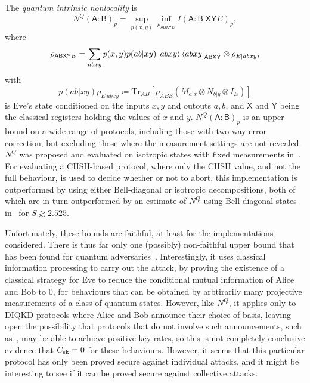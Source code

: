 \documentclass[10pt, a4paper]{article}
\numberwithin{equation}{section} %
\theoremstyle{definition}
\theoremstyle{plain}
\newcommand{\?}{\mathrel{?}} %
\newcommand{\Tr}{\mathrm{Tr}} %
\newcommand{\crv}[1]{\mathsf{#1}}
\newcommand{\sk}{\rm sk}
\begin{document}
      The \emph{quantum intrinsic nonlocality} is~\cite{DIQKD_Limits}
      \begin{equation}
        N^Q{(\crv{A}:\crv{B})}_p = \sup_{p(x,y)} \inf_{\rho_{\crv{ABXY}E}} I{(\crv{A}:\crv{B}|\crv{XY}E)}_{\rho},
      \end{equation}
      where
      \begin{align}
        \rho_{\crv{ABXY}E} = \sum_{abxy} p(x,y) p(ab|xy) \ket{abxy}\bra{abxy}_{\crv{ABXY}} \otimes \rho_{E|abxy},
      \end{align}
      with
      \begin{equation}
        p(ab|xy) \rho_{E|abxy} \coloneqq \Tr_{A B}\left[\rho_{A B E} \left(M_{a|x} \otimes N_{b|y} \otimes I_{E}\right) \right]
      \end{equation}
      is Eve's state conditioned on the inputs \(x,y\) and outouts \(a,b\), and \(\crv{X}\) and \(\crv{Y}\) being the classical registers holding the values of \(x\) and \(y\). \(N^Q{(\crv{A}:\crv{B})}_p\) is an upper bound on a wide range of protocols, including those with two-way error correction, but excluding those where the measurement settings are not revealed. \(N^Q\) was proposed and evaluated on isotropic states with fixed measurements in~\cite{DIQKD_Limits}. For evaluating a CHSH-based protocol, where only the CHSH value, and not the full behaviour, is used to decide whether or not to abort, this implementation is outperformed by  using either Bell-diagonal or isotropic decompositions, both of which are in turn outperformed by an estimate of \(N^Q\) using Bell-diagonal states in~\cite[Appendix B]{RevisedPeres} for \(S \gtrsim 2.525\).

      Unfortunately, these bounds are faithful, at least for the implementations considered. There is thus far only one (possibly) non-faithful upper bound that has been found for quantum adversaries~\cite{NotSufficient}. Interestingly, it uses classical information processing to carry out the attack, by proving the existence of a classical strategy for Eve to reduce the conditional mutual information of Alice and Bob to 0, for behaviours that can be obtained by arbtirarily many projective measurements of a class of quantum states. However, like \(N^Q\), it applies only to DIQKD protocols where Alice and Bob announce their choice of basis, leaving open the possibility that protocols that do not involve such announcements, such as~\cite{NonstandardProtocol}, may be able to achieve positive key rates, so this is not completely conclusive evidence that \(C_{\sk} = 0\) for these behaviours. However, it seems that this particular protocol has only been proved secure against individual attacks, and it might be interesting to see if it can be proved secure against collective attacks.
\end{document}
